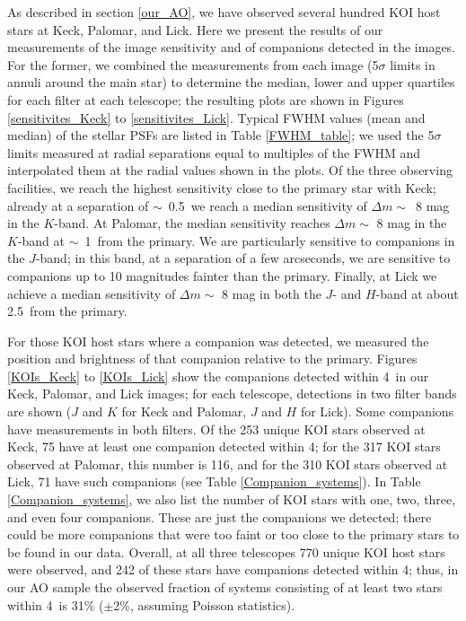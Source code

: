 \documentclass[twocolumn,appendixfloats]{aastex6}
\begin{document}
As described in section \ref{our_AO}, we have observed several hundred KOI host 
stars at Keck, Palomar, and Lick. Here we present the results of our measurements
of the image sensitivity and of companions detected in the images. For the former, we 
combined the measurements from each image (5$\sigma$ limits in annuli around the 
main star) to determine the median, lower and upper quartiles for each filter 
at each telescope; the resulting plots are shown in Figures \ref{sensitivites_Keck} 
to \ref{sensitivites_Lick}. Typical FWHM values (mean and median) of the stellar 
PSFs are listed in Table \ref{FWHM_table}; we used the 5$\sigma$ limits measured
at radial separations equal to multiples of the FWHM and interpolated them at
the radial values shown in the plots.
Of the three observing facilities, we reach the highest sensitivity close to the 
primary star with Keck; already at a separation of $\sim$~0.5\arcsec\ we reach 
a median sensitivity of $\Delta m \sim$~8 mag in the $K$-band. At Palomar, 
the median sensitivity reaches $\Delta m \sim$ 8 mag in the $K$-band at 
$\sim$~1\arcsec\ from the primary. We are particularly sensitive to companions 
in the $J$-band; in this band, at a separation of a few arcseconds, we are sensitive 
to companions up to 10 magnitudes fainter than the primary. Finally, at Lick we 
achieve a median sensitivity of $\Delta m \sim$ 8 mag in both the $J$- and 
$H$-band at about 2.5\arcsec\ from the primary.

For those KOI host stars where a companion was detected, we measured the 
position and brightness of that companion relative to the primary. Figures 
\ref{KOIs_Keck} to \ref{KOIs_Lick} show the companions detected within 
4\arcsec\ in our Keck, Palomar, and Lick images; for each telescope, detections 
in two filter bands are shown ($J$ and $K$ for Keck and Palomar, $J$ and $H$ 
for Lick). Some companions have measurements in both filters. Of the 253 unique 
KOI stars observed at Keck, 75 have at least one companion detected within 
4\arcsec; for the 317 KOI stars observed at Palomar, this number is 116, and 
for the 310 KOI stars observed at Lick, 71 have such companions (see Table 
\ref{Companion_systems}). In Table \ref{Companion_systems}, we also list 
the number of KOI stars with one, two, three, and even four companions. 
These are just the companions we detected; there could be more companions 
that were too faint or too close to the primary stars to be found in our data.
Overall, at all three telescopes 770 unique KOI host stars were observed, 
and 242 of these stars have companions detected within 4\arcsec; thus, in our 
AO sample the observed fraction of systems consisting of at least two stars 
within 4\arcsec\ is 31\% ($\pm$2\%, assuming Poisson statistics).
\end{document}
